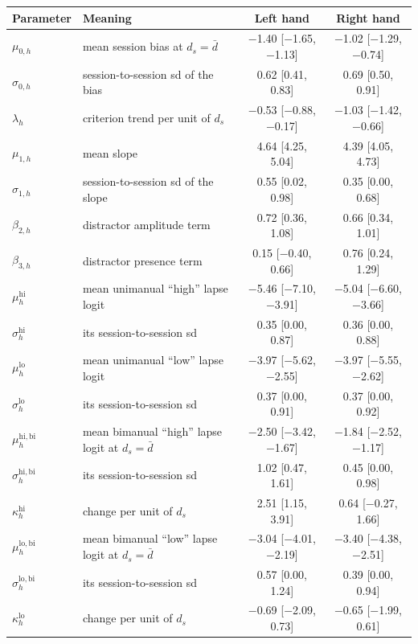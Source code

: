 \begin{tabular}{@{}llcc@{}}
\toprule
Parameter & Meaning & Left hand & Right hand \\
\midrule
$\mu_{0,h}$ & mean session bias at $d_s=\bar d$ & \ensuremath{-}1.40 [\ensuremath{-}1.65, \ensuremath{-}1.13] & \ensuremath{-}1.02 [\ensuremath{-}1.29, \ensuremath{-}0.74] \\
$\sigma_{0,h}$ & session-to-session sd of the bias & 0.62 [0.41, 0.83] & 0.69 [0.50, 0.91] \\
$\lambda_h$ & criterion trend per unit of $d_s$ & \ensuremath{-}0.53 [\ensuremath{-}0.88, \ensuremath{-}0.17] & \ensuremath{-}1.03 [\ensuremath{-}1.42, \ensuremath{-}0.66] \\
$\mu_{1,h}$ & mean slope & 4.64 [4.25, 5.04] & 4.39 [4.05, 4.73] \\
$\sigma_{1,h}$ & session-to-session sd of the slope & 0.55 [0.02, 0.98] & 0.35 [0.00, 0.68] \\
$\beta_{2,h}$ & distractor amplitude term & 0.72 [0.36, 1.08] & 0.66 [0.34, 1.01] \\
$\beta_{3,h}$ & distractor presence term & 0.15 [\ensuremath{-}0.40, 0.66] & 0.76 [0.24, 1.29] \\
$\mu^{\mathrm{hi}}_h$ & mean unimanual ``high'' lapse logit & \ensuremath{-}5.46 [\ensuremath{-}7.10, \ensuremath{-}3.91] & \ensuremath{-}5.04 [\ensuremath{-}6.60, \ensuremath{-}3.66] \\
$\sigma^{\mathrm{hi}}_h$ & its session-to-session sd & 0.35 [0.00, 0.87] & 0.36 [0.00, 0.88] \\
$\mu^{\mathrm{lo}}_h$ & mean unimanual ``low'' lapse logit & \ensuremath{-}3.97 [\ensuremath{-}5.62, \ensuremath{-}2.55] & \ensuremath{-}3.97 [\ensuremath{-}5.55, \ensuremath{-}2.62] \\
$\sigma^{\mathrm{lo}}_h$ & its session-to-session sd & 0.37 [0.00, 0.91] & 0.37 [0.00, 0.92] \\
$\mu^{\mathrm{hi,bi}}_h$ & mean bimanual ``high'' lapse logit at $d_s=\bar d$ & \ensuremath{-}2.50 [\ensuremath{-}3.42, \ensuremath{-}1.67] & \ensuremath{-}1.84 [\ensuremath{-}2.52, \ensuremath{-}1.17] \\
$\sigma^{\mathrm{hi,bi}}_h$ & its session-to-session sd & 1.02 [0.47, 1.61] & 0.45 [0.00, 0.98] \\
$\kappa^{\mathrm{hi}}_h$ & change per unit of $d_s$ & 2.51 [1.15, 3.91] & 0.64 [\ensuremath{-}0.27, 1.66] \\
$\mu^{\mathrm{lo,bi}}_h$ & mean bimanual ``low'' lapse logit at $d_s=\bar d$ & \ensuremath{-}3.04 [\ensuremath{-}4.01, \ensuremath{-}2.19] & \ensuremath{-}3.40 [\ensuremath{-}4.38, \ensuremath{-}2.51] \\
$\sigma^{\mathrm{lo,bi}}_h$ & its session-to-session sd & 0.57 [0.00, 1.24] & 0.39 [0.00, 0.94] \\
$\kappa^{\mathrm{lo}}_h$ & change per unit of $d_s$ & \ensuremath{-}0.69 [\ensuremath{-}2.09, 0.73] & \ensuremath{-}0.65 [\ensuremath{-}1.99, 0.61] \\
\bottomrule
\end{tabular}
